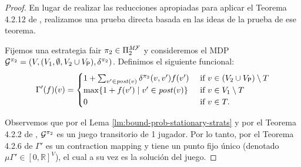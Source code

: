 \begin{proof}
  En lugar de realizar las reducciones apropiadas para aplicar el Teorema 4.2.12 de \cite[p.~174]{FilarV96}, realizamos una prueba directa basada en las ideas
  de la prueba de ese teorema.
  
  Fijemos una estrategia fair $\pi_{2} \in \Pi^{\textit{M}\mathcal{F}}_{2}$ y
  consideremos el MDP
  $\mathcal{G}^{\pi_{2}} = (V, (V_1, \emptyset, V_2 \cup V_{\mathsf{P}}), \delta^{\pi_{2}})$.
  Definimos el siguiente funcional:
  \[
  \Gamma'(f)(v) =
  \begin{cases}
    1 + \sum_{v' \in \mathit{post}(v)} \delta^{\pi_{2}}(v,v')  f(v') & \text{ if } v \in (V_2 \cup V_{\mathsf{P}}) \setminus T  \\
    \max \{1  + f(v') \mid v' \in \mathit{post}(v) \} & \text{ if } v \in  V_1 \setminus T \\
    0 & \text{ if } v \in T.
  \end{cases}
  \]
  
  Observemos que por el Lema \ref{lm:bound-prob-stationary-strats} y por el Teorema 4.2.2 de \cite{FilarV96},  $\mathcal{G}^{\pi_{2}}$
  es un juego transitorio de 1 jugador. Por lo tanto, por el Teorema 4.2.6 de \cite{FilarV96} $\Gamma'$ es un contraction mapping y tiene un punto fijo único (denotado $\mu \Gamma' \in [0,\mathbb{R}]^V$), el cual a su vez es la solución del juego.
  

\end{proof}
